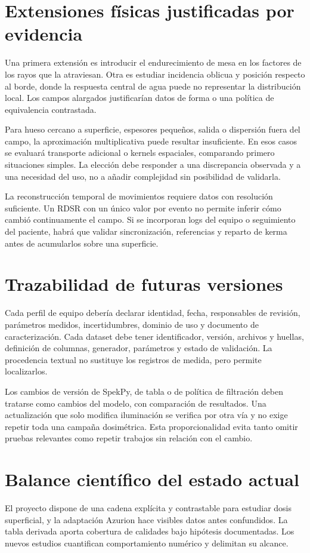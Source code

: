 \section{Extensiones físicas justificadas por evidencia}
Una primera extensión es introducir el endurecimiento de mesa en los factores de los rayos que la atraviesan. Otra es estudiar incidencia oblicua y posición respecto al borde, donde la respuesta central de agua puede no representar la distribución local. Los campos alargados justificarían datos de forma o una política de equivalencia contrastada.

Para hueso cercano a superficie, espesores pequeños, salida o dispersión fuera del campo, la aproximación multiplicativa puede resultar insuficiente. En esos casos se evaluará transporte adicional o kernels espaciales, comparando primero situaciones simples. La elección debe responder a una discrepancia observada y a una necesidad del uso, no a añadir complejidad sin posibilidad de validarla.

La reconstrucción temporal de movimientos requiere datos con resolución suficiente. Un RDSR con un único valor por evento no permite inferir cómo cambió continuamente el campo. Si se incorporan logs del equipo o seguimiento del paciente, habrá que validar sincronización, referencias y reparto de kerma antes de acumularlos sobre una superficie.

\section{Trazabilidad de futuras versiones}
Cada perfil de equipo debería declarar identidad, fecha, responsables de revisión, parámetros medidos, incertidumbres, dominio de uso y documento de caracterización. Cada dataset debe tener identificador, versión, archivos y huellas, definición de columnas, generador, parámetros y estado de validación. La procedencia textual no sustituye los registros de medida, pero permite localizarlos.

Los cambios de versión de SpekPy, de tabla o de política de filtración deben tratarse como cambios del modelo, con comparación de resultados. Una actualización que solo modifica iluminación se verifica por otra vía y no exige repetir toda una campaña dosimétrica. Esta proporcionalidad evita tanto omitir pruebas relevantes como repetir trabajos sin relación con el cambio.

\section{Balance científico del estado actual}
El proyecto dispone de una cadena explícita y contrastable para estudiar dosis superficial, y la adaptación Azurion hace visibles datos antes confundidos. La tabla derivada aporta cobertura de calidades bajo hipótesis documentadas. Los nuevos estudios cuantifican comportamiento numérico y delimitan su alcance.

